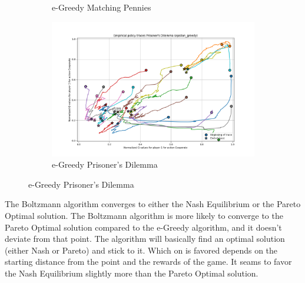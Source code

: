 \documentclass[12pt,letterpaper, onecolumn]{exam}
\begin{document}
\begin{figure}
\begin{subfigure}{.5\textwidth}
      \caption{e-Greedy Matching Pennies}
      \label{fig:sfigemp}
    \end{subfigure}%
    \begin{subfigure}{.5\textwidth}
      \centering
      \includegraphics[width=.6\linewidth]{plots/replicator_trajectoreis_Prisoner's Dilemma_epsilon_greedy.png}
      \caption{e-Greedy Prisoner's Dilemma}
      \label{fig:sfigepd}
    \end{subfigure}%
\end{figure}

The Boltzmann algorithm converges to either the Nash Equilibrium or the Pareto Optimal solution. The Boltzmann algorithm is more likely to converge to the Pareto Optimal solution
compared to the e-Greedy algorithm, and it doesn't deviate from that point. The algorithm will basically find an optimal solution (either Nash or Pareto) and stick to it.
Which on is favored depends on the starting distance from the point and the rewards of the game. It seams to favor the Nash Equilibrium slightly more than the Pareto Optimal solution.
\end{document}

